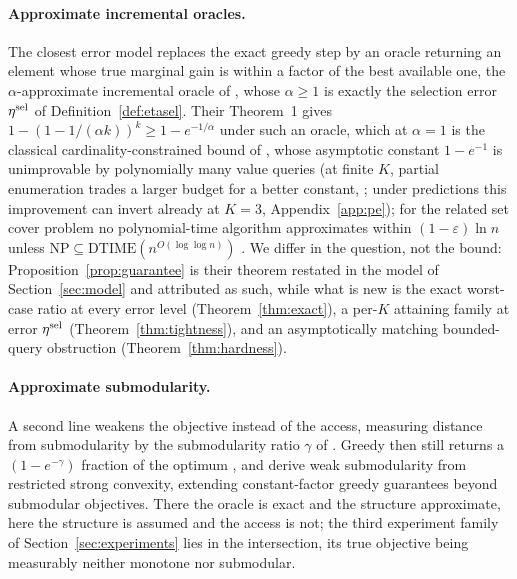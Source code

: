 \paragraph{Approximate incremental oracles.}
The closest error model replaces the exact greedy step by an oracle returning
an element whose true marginal gain is within a factor of the best available
one, the $\alpha$-approximate incremental oracle of
\citet{goundan2007revisiting}, whose $\alpha\ge1$ is exactly the selection
error $\eta^{\mathrm{sel}}$ of Definition~\ref{def:etasel}.  Their Theorem~1 gives
$1-(1-1/(\alpha k))^{k}\ge1-e^{-1/\alpha}$ under such an oracle, which at
$\alpha=1$ is the classical cardinality-constrained bound of
\citet{nemhauser1978analysis}, whose asymptotic constant $1-e^{-1}$ is
unimprovable by polynomially many value queries \citep{nemhauser1978best}
(at finite $K$, partial enumeration trades a larger budget for a better
constant, \citealp[Section~7, Theorem~7.1]{nemhauser1978analysis}; under
predictions this improvement can invert already at $K=3$,
Appendix~\ref{app:pe}); for the related set cover problem no
polynomial-time algorithm approximates within $(1-\varepsilon)\ln n$ unless
$\mathrm{NP}\subseteq\mathrm{DTIME}(n^{O(\log\log n)})$
\citep{feige1998threshold}.  We differ in the question, not the bound:
Proposition~\ref{prop:guarantee} is their theorem restated in the model of
Section~\ref{sec:model} and attributed as such, while what is new is the
exact worst-case ratio at every error level (Theorem~\ref{thm:exact}), a
per-$K$ attaining family at error $\eta^{\mathrm{sel}}$ (Theorem~\ref{thm:tightness}),
and an asymptotically matching bounded-query obstruction
(Theorem~\ref{thm:hardness}).

\paragraph{Approximate submodularity.}
A second line weakens the objective instead of the access, measuring distance
from submodularity by the submodularity ratio $\gamma$ of
\citet[Definition~2.3]{das2011submodular}.  Greedy then still returns a
$(1-e^{-\gamma})$ fraction of the optimum \citep[Theorem~3.2]{das2011submodular},
and \citet{elenberg2018restricted} derive weak submodularity from restricted
strong convexity, extending constant-factor greedy guarantees beyond
submodular objectives.  There the oracle is exact and the structure
approximate, here the structure is assumed and the access is not; the third
experiment family of Section~\ref{sec:experiments} lies in the intersection,
its true objective being measurably neither monotone nor submodular.

